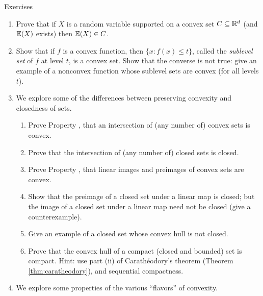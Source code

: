 \clearpage

\begin{xcb}{Exercises}
\begin{enumerate}[label=\thechapter.\arabic*]
\settowidth{\leftmargini}{0.00.\hskip\labelsep}
\item Prove that if $X$ is a random variable supported on a convex set $C
  \subseteq \mathbb{R}^d$ (and $\mathbb{E}(X)$ exists) then $\mathbb{E}(X) \in C$.  

\item \label{ex:convex_sublevel}
  Show that if $f$ is a convex function, then $\{x : f(x) \leq t \}$, called the
  \emph{sublevel set} of $f$ at level $t$, is a convex set. Show that the
  converse is not true: give an example of a nonconvex function whose sublevel
  sets are convex (for all levels $t$).

\item \label{ex:convex_closed}
  We explore some of the differences between preserving convexity and closedness
  of sets. 

\begin{enumerate}[label=\alph*.]
\item Prove Property , that an intersection of
  (any number of) convex sets is convex.

\item Prove that the intersection of (any number of) closed sets is closed.

\item Prove Property , that linear images and preimages
  of convex sets are convex. 

\item Show that the preimage of a closed set under a linear map is closed; but
  the image of a closed set under a linear map need not be closed (give a
  counterexample). 

\item Give an example of a closed set whose convex hull is not closed. 
  
\item Prove that the convex hull of a compact (closed and bounded) set is
  compact. Hint: use part (ii) of Carath\'{e}odory's theorem (Theorem
  \ref{thm:caratheodory}), and sequential compactness.   
\end{enumerate}

\item \label{ex:convex_flavors}
  We explore some properties of the various ``flavors'' of convexity.   


\end{enumerate}
\end{xcb}

